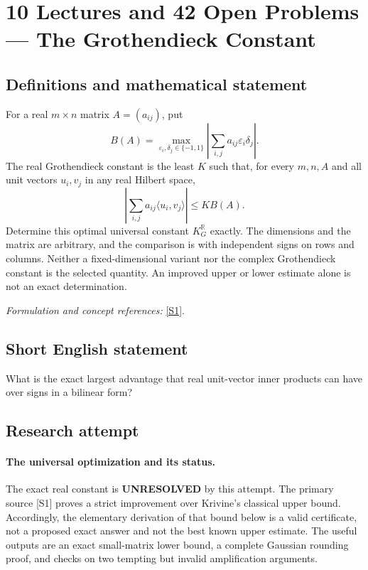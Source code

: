 \documentclass[11pt]{article}
\begin{document}
\section*{\texorpdfstring{10 Lectures and 42 Open Problems — The Grothendieck Constant}{10 Lectures and 42 Open Problems — The Grothendieck Constant}}\label{statement}
\subsection{Definitions and mathematical statement}
For a real $m\times n$ matrix $A=(a_{ij})$, put
\[
 B(A)=\max_{{\varepsilon}_i,\delta_j\in\{-1,1\}}
 \left|\sum_{i,j}a_{ij}{\varepsilon}_i\delta_j\right|.
\]
The real Grothendieck constant is the least $K$ such that, for every $m,n,A$ and all unit vectors $u_i,v_j$ in any real Hilbert space,
\[
 \left|\sum_{i,j}a_{ij}\langle u_i,v_j\rangle\right|\le K B(A).
\]
Determine this optimal universal constant $K_G^{{\mathbb{R}}}$ exactly. The dimensions and the matrix are arbitrary, and the comparison is with independent signs on rows and columns. Neither a fixed-dimensional variant nor the complex Grothendieck constant is the selected quantity. An improved upper or lower estimate alone is not an exact determination.
\par\smallskip\textit{Formulation and concept references:} \href{https://arxiv.org/abs/1103.6161}{[S1]}.

\subsection{Short English statement}
What is the exact largest advantage that real unit-vector inner products can have over signs in a bilinear form?
\subsection{Research attempt}
\paragraph{The universal optimization and its status.}
The exact real constant is \textbf{UNRESOLVED} by this attempt.
The primary source [S1] proves a strict improvement over Krivine's
classical upper bound. Accordingly, the elementary derivation of
that bound below is a valid certificate, not a proposed exact answer
and not the best known upper estimate. The useful outputs are an
exact small-matrix lower bound, a complete Gaussian rounding proof,
and checks on two tempting but invalid amplification arguments.
\end{document}
